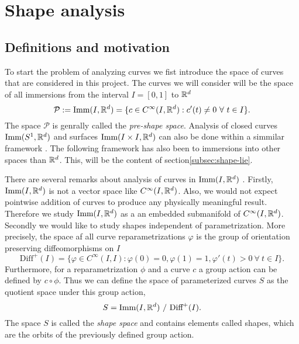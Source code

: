 
\section{Shape analysis}
\subsection{Definitions and motivation}
To start the problem of analyzing curves we fist introduce the space of curves that are considered in this project. The curves we will consider will be the space of all immersions from the interval  \(I = [0, 1]\) to  \(\mathbb{R}^d\)
\begin{equation}
  \mathcal{P}:= \text{Imm}(I, \mathbb{R}^d) = \{c \in C^{\infty}(I, \mathbb{R}^d) :  c'(t) \neq  0 \ \forall \ t \in I  \}.
\end{equation}
The space \(\mathcal{P}\) is genrally called the \emph{pre-shape space}. Analysis of closed curves \(\text{Imm}(S^1, \mathbb{R}^d)\) and surfaces \(\text{Imm}(I \times I, \mathbb{R}^d)\) can also be done within a simmilar framework \cite{bauer2014overview}.
The following framework has also been to immersions into other spaces than  \(\mathbb{R}^d\). This, will be the content of section\ref{subsec:shape-lie}. 

There are several remarks about analysis of curves in  \(\text{Imm}(I, \mathbb{R}^d)\) . Firstly,  \(\text{Imm}(I, \mathbb{R}^d)\) is not a vector space like  \(C^{\infty}(I, \mathbb{R}^d)\). Also, we would not expect pointwise addition of curves to produce any physically meaningful result. Therefore we study  \(\text{Imm}(I, \mathbb{R}^d)\) as a an embedded submanifold of  \(C^{\infty}(I, \mathbb{R}^d)\). Secondly we would like to study shapes independent of parametrization. More precisely, the space af all curve reparametrizations   \(\varphi\) is the group of orientation preserving diffeomorphisms on  \(I\)
\begin{equation}
  \text{Diff}^+(I) = \{\varphi \in C^{\infty}(I,I): \varphi(0) = 0, \varphi(1) = 1, \varphi'(t) > 0 \ \forall \ t \in I \}.
\end{equation}
Furthermore, for a reparametrization  \(\phi \) and a curve  \(c\) a group action can be defined by  \(c \circ \phi\). Thus we can define the space of parameterized curves  \(S\) as the quotient space under this group action,
\begin{equation}
  S = {\text{Imm}(I, \R^d)} \ / \ {\text{Diff}^+(I)}.
\end{equation}
The space  \(S\) is called the \emph{shape space} and contains elements called shapes, which are the orbits of the previously defined group action. 


